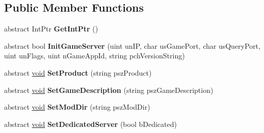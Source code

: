 \subsection*{Public Member Functions}
\begin{DoxyCompactItemize}
\item 
\hypertarget{classValve_1_1Steamworks_1_1ISteamGameServer_abc62d020895632dfb059c2caf0a55919}{}abstract Int\+Ptr {\bfseries Get\+Int\+Ptr} ()\label{classValve_1_1Steamworks_1_1ISteamGameServer_abc62d020895632dfb059c2caf0a55919}

\item 
\hypertarget{classValve_1_1Steamworks_1_1ISteamGameServer_a630deec11f56f6973855740e4dddae16}{}abstract bool {\bfseries Init\+Game\+Server} (uint un\+I\+P, char us\+Game\+Port, char us\+Query\+Port, uint un\+Flags, uint n\+Game\+App\+Id, string pch\+Version\+String)\label{classValve_1_1Steamworks_1_1ISteamGameServer_a630deec11f56f6973855740e4dddae16}

\item 
\hypertarget{classValve_1_1Steamworks_1_1ISteamGameServer_a384f6155b77a02d73cc34cfe9774bfa3}{}abstract \hyperlink{SDL__audio_8h_a52835ae37c4bb905b903cbaf5d04b05f}{void} {\bfseries Set\+Product} (string psz\+Product)\label{classValve_1_1Steamworks_1_1ISteamGameServer_a384f6155b77a02d73cc34cfe9774bfa3}

\item 
\hypertarget{classValve_1_1Steamworks_1_1ISteamGameServer_a5275d0e93c58089aa64c2a133c11effc}{}abstract \hyperlink{SDL__audio_8h_a52835ae37c4bb905b903cbaf5d04b05f}{void} {\bfseries Set\+Game\+Description} (string psz\+Game\+Description)\label{classValve_1_1Steamworks_1_1ISteamGameServer_a5275d0e93c58089aa64c2a133c11effc}

\item 
\hypertarget{classValve_1_1Steamworks_1_1ISteamGameServer_ac2835a52d9809337ffe088ce04fe55cc}{}abstract \hyperlink{SDL__audio_8h_a52835ae37c4bb905b903cbaf5d04b05f}{void} {\bfseries Set\+Mod\+Dir} (string psz\+Mod\+Dir)\label{classValve_1_1Steamworks_1_1ISteamGameServer_ac2835a52d9809337ffe088ce04fe55cc}

\item 
\hypertarget{classValve_1_1Steamworks_1_1ISteamGameServer_a208d08bb2a65cb8430377b243aacdf0e}{}abstract \hyperlink{SDL__audio_8h_a52835ae37c4bb905b903cbaf5d04b05f}{void} {\bfseries Set\+Dedicated\+Server} (bool b\+Dedicated)\label{classValve_1_1Steamworks_1_1ISteamGameServer_a208d08bb2a65cb8430377b243aacdf0e}


\end{DoxyCompactItemize}
